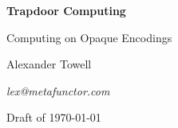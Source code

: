 \begin{titlepage}
\centering
\vspace*{3cm}
{\Huge\bfseries Trapdoor Computing\par}
\vspace{0.6cm}
{\Large Computing on Opaque Encodings\par}
\vspace{2.5cm}
{\large Alexander Towell\par}
\vspace{0.3cm}
{\small\itshape lex@metafunctor.com\par}
\vfill
{\small Draft of \today\par}
\end{titlepage}
